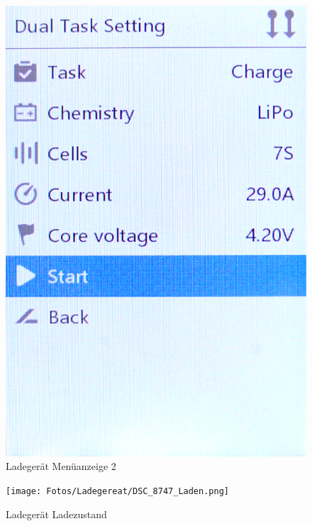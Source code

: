 \begin{figure}[H]
    \centering
    \includegraphics[width=.35\textwidth]{Fotos/Ladegereat/DSC_8745_Lademenue_2.png}
    \caption{Ladegerät Menüanzeige 2}
\end{figure}

\begin{figure}[H]
    \centering
    \texttt{[image: Fotos/Ladegereat/DSC\_8747\_Laden.png]}
    \caption{Ladegerät Ladezustand}
\end{figure}

